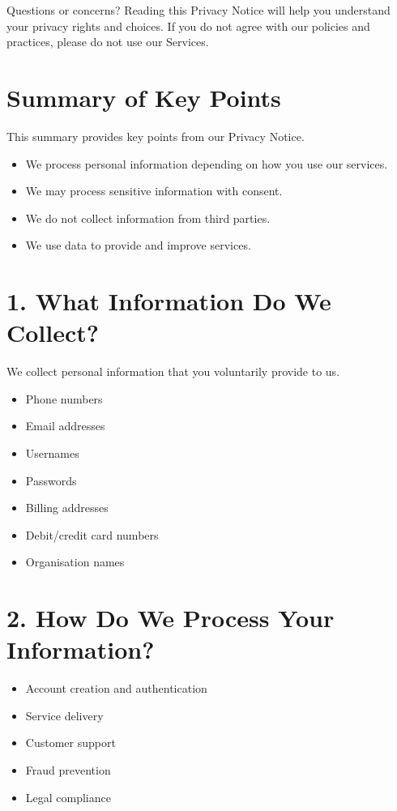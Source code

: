 \documentclass[11pt, a4paper]{report}
\begin{document}
\begin{itemize}
Questions or concerns? Reading this Privacy Notice will help you understand your privacy rights and choices. If you do not agree with our policies and practices, please do not use our Services.

\section*{Summary of Key Points}
This summary provides key points from our Privacy Notice.

\begin{itemize}
	\item We process personal information depending on how you use our services.
	\item We may process sensitive information with consent.
	\item We do not collect information from third parties.
	\item We use data to provide and improve services.
\end{itemize}

\section*{1. What Information Do We Collect?}
We collect personal information that you voluntarily provide to us.

\begin{itemize}
	\item Phone numbers
	\item Email addresses
	\item Usernames
	\item Passwords
	\item Billing addresses
	\item Debit/credit card numbers
	\item Organisation names
\end{itemize}

\section*{2. How Do We Process Your Information?}
\begin{itemize}
	\item Account creation and authentication
	\item Service delivery
	\item Customer support
	\item Fraud prevention
	\item Legal compliance
\end{itemize}


\end{itemize}
\end{document}
